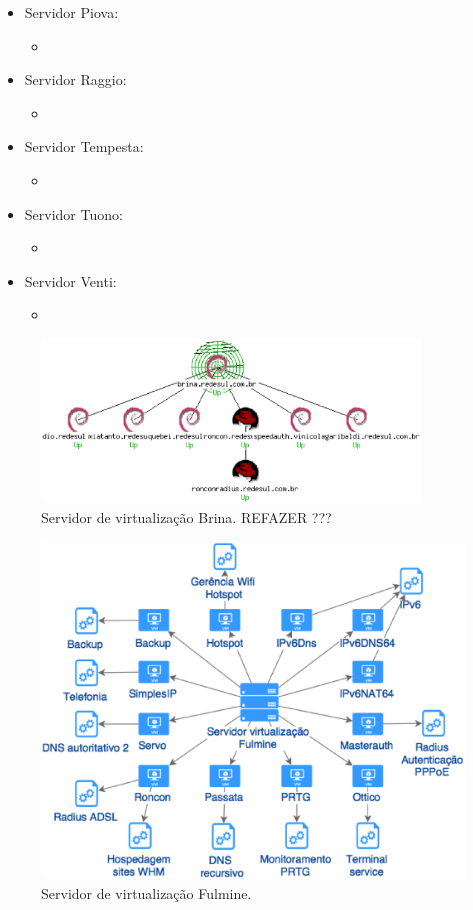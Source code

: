 \begin{itemize}
 \item Servidor Piova: 
 \begin{itemize}
  \item 
 \end{itemize}
 \item Servidor Raggio: 
 \begin{itemize}
  \item 
 \end{itemize}
 \item Servidor Tempesta: 
 \begin{itemize}
  \item 
 \end{itemize}
 \item Servidor Tuono: 
 \begin{itemize}
  \item 
 \end{itemize}
 \item Servidor Venti: 
 \begin{itemize}
  \item 
 \end{itemize}
\end{itemize}

\begin{figure}[servlog1]
 \centering
 \includegraphics[width=380px]{img/servlog1.eps}
 \caption{Servidor de virtualização Brina. REFAZER ???}
 \label{fig:servlog1}
\end{figure}

\begin{figure}[servlog2]
 \centering
 \includegraphics[width=430px]{img/servlog2.eps}
 \caption{Servidor de virtualização Fulmine.}
 \label{fig:servlog2}
\end{figure}

